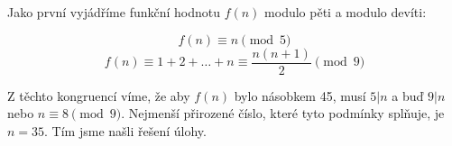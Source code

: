 \documentclass{fkssolpub}
\author{Ondřej Sedláček}
\begin{document}
Jako první vyjádříme funkční hodnotu $f(n)$ modulo pěti a modulo devíti:

\[
	f(n) \equiv n \pmod{5}
\]
\[
	f(n) \equiv 1 + 2 + \dots + n \equiv \frac{n (n + 1)}{2} \pmod{9}
\]

Z těchto kongruencí víme, že aby $f(n)$ bylo násobkem 45, musí $5 \vert n$ a buď $9 \vert n$ nebo $n \equiv 8 \pmod{9}$. Nejmenší přirozené číslo, které tyto podmínky splňuje, je $n = 35$. Tím jsme našli řešení úlohy.
\end{document}
